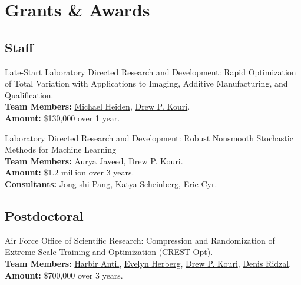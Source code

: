 \documentclass[10pt, a4paper]{article}
\newcommand{\years}[1]{\marginnote{\scriptsize #1}}
\begin{document}
\section*{Grants \& Awards}
\subsection*{Staff}
\years{2024} Late-Start Laboratory Directed Research and Development: Rapid Optimization of Total Variation with Applications to Imaging, Additive Manufacturing, and Qualification. \\
\textbf{Team Members:} \href{https://www.sandia.gov/research/publications/search/?sort=date&format=citation&authors%5B0%5D=michael-heiden}{Michael Heiden}, \href{https://cfwebprod.sandia.gov/cfdocs/CompResearch/templates/insert/profile.cfm?dpkouri}{Drew P. Kouri}.\\
\textbf{Amount:} \$130,000 over 1 year.

\noindent
\years{2023} Laboratory Directed Research and Development: Robust Nonsmooth Stochastic Methods for Machine Learning\\
\textbf{Team Members:} \href{https://rol.sandia.gov/team/}{Aurya Javeed},
\href{https://cfwebprod.sandia.gov/cfdocs/CompResearch/templates/insert/profile.cfm?dpkouri}{Drew P. Kouri}.\\
\textbf{Amount:} \$1.2 million over 3 years.\\
\textbf{Consultants:} \href{https://viterbi.usc.edu/directory/faculty/Pang/Jong-Shi}{Jong-shi Pang}, \href{https://www.orie.cornell.edu/faculty-directory/katya-scheinberg}{Katya Scheinberg}, \href{https://www.sandia.gov/ccr/staff/eric-christopher-cyr/}{Eric Cyr}.
\noindent
\subsection*{Postdoctoral}
\years{2022} Air Force Office of Scientific Research: Compression and Randomization of Extreme-Scale Training and Optimization (CREST-Opt).\\
 \textbf{Team Members:}
\href{https://math.gmu.edu/~hantil/}{Harbir Antil},
\href{https://math.gmu.edu/~eherberg/}{Evelyn Herberg},
\href{https://cfwebprod.sandia.gov/cfdocs/CompResearch/templates/insert/profile.cfm?dpkouri}{Drew P. Kouri},
\href{https://cfwebprod.sandia.gov/cfdocs/CompResearch/templates/insert/profile.cfm?dridzal}{Denis Ridzal}.\\
 \textbf{Amount:} \$700,000 over 3 years.\\
\end{document}
